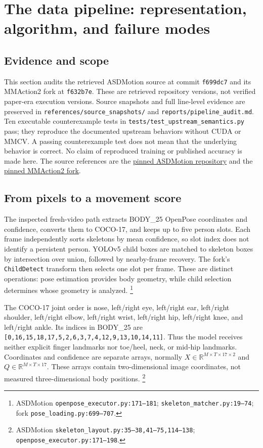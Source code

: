 \section{The data pipeline: representation, algorithm, and failure modes}
\label{sec:pipeline-audit}

\subsection{Evidence and scope}
This section audits the retrieved ASDMotion source at commit
\texttt{f699dc7} and its MMAction2 fork at \texttt{f632b7e}.
These are retrieved repository versions, not verified paper-era execution
versions. Source snapshots and full line-level evidence are preserved in
\texttt{references/source\_snapshots/} and
\texttt{reports/pipeline\_audit.md}. Ten executable counterexample tests
in \texttt{tests/test\_upstream\_semantics.py} pass; they reproduce the
documented upstream behaviors without CUDA or MMCV. A passing
counterexample test does not mean that the underlying behavior is correct.
No claim of reproduced training or published accuracy is made here.
The source references are the
\href{https://github.com/Dinstein-Lab/ASDMotion/tree/f699dc7b7af5726df5d8e79161d192eac22cfafb}{pinned ASDMotion repository}
and the
\href{https://github.com/TalBarami/mmaction2/tree/f632b7e56291805ac6d4debc8c7421b0d2c48f2e}{pinned MMAction2 fork}.

\subsection{From pixels to a movement score}
The inspected fresh-video path extracts BODY\_25 OpenPose coordinates and
confidence, converts them to COCO-17, and keeps up to five person slots.
Each frame independently sorts skeletons by mean confidence, so slot index
does not identify a persistent person. YOLOv5 child boxes are matched to
skeleton boxes by intersection over union, followed by nearby-frame
recovery. The fork's \texttt{ChildDetect} transform then selects one slot
per frame. These are distinct operations: pose estimation provides body
geometry, while child selection determines whose geometry is analyzed.
\footnote{ASDMotion \texttt{openpose\_executor.py:171--181};
\texttt{skeleton\_matcher.py:19--74}; fork
\texttt{pose\_loading.py:699--707}.}

The COCO-17 joint order is nose, left/right eye, left/right ear,
left/right shoulder, left/right elbow, left/right wrist, left/right hip,
left/right knee, and left/right ankle. Its indices in BODY\_25 are
\texttt{[0,16,15,18,17,5,2,6,3,7,4,12,9,13,10,14,11]}.
Thus the model receives neither explicit finger landmarks nor toe/heel,
neck, or mid-hip landmarks. Coordinates and confidence are separate arrays,
normally $X\in\mathbb{R}^{M\times T\times17\times2}$ and
$Q\in\mathbb{R}^{M\times T\times17}$. These arrays contain two-dimensional
image coordinates, not measured three-dimensional body positions.
\footnote{ASDMotion \texttt{skeleton\_layout.py:35--38,41--75,114--138};
\texttt{openpose\_executor.py:171--198}.}

